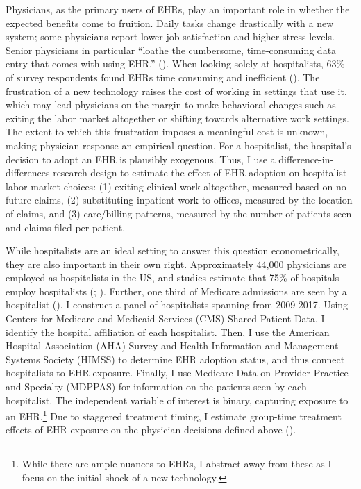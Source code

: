 \documentclass[12pt]{article}
\begin{document}
Physicians, as the primary users of EHRs, play an important role in whether the expected benefits come to fruition. Daily tasks change drastically with a new system; some physicians report lower job satisfaction and higher stress levels. Senior physicians in particular “loathe the cumbersome, time-consuming data entry that comes with using EHR.” (\cite{CollierBurnout}). When looking solely at hospitalists, 63\% of survey respondents found EHRs time consuming and inefficient (\cite{czernik2022hospitalist}). The frustration of a new technology raises the cost of working in settings that use it, which may lead physicians on the margin to make behavioral changes such as exiting the labor market altogether or shifting towards alternative work settings. The extent to which this frustration imposes a meaningful cost is unknown, making physician response an empirical question. For a hospitalist, the hospital's decision to adopt an EHR is plausibly exogenous. Thus, I use a difference-in-differences research design to estimate the effect of EHR adoption on hospitalist labor market choices: (1) exiting clinical work altogether, measured based on no future claims, (2) substituting inpatient work to offices, measured by the location of claims, and (3) care/billing patterns, measured by the number of patients seen and claims filed per patient.

While hospitalists are an ideal setting to answer this question econometrically, they are also important in their own right. Approximately 44,000 physicians are employed as hospitalists in the US, and studies estimate that 75\% of hospitals employ hospitalists (\cite{bls}; \cite{healthecareers_2022}). Further, one third of Medicare admissions are seen by a hospitalist (\cite{messler2015history}). I construct a panel of hospitalists spanning from 2009-2017. Using Centers for Medicare and Medicaid Services (CMS) Shared Patient Data, I identify the hospital affiliation of each hospitalist. Then, I use the American Hospital Association (AHA) Survey and Health Information and Management Systems Society (HIMSS) to determine EHR adoption status, and thus connect hospitalists to EHR exposure. Finally, I use Medicare Data on Provider Practice and Specialty (MDPPAS) for information on the patients seen by each hospitalist. The independent variable of interest is binary, capturing exposure to an EHR.\footnote{While there are ample nuances to EHRs, I abstract away from these as I focus on the initial shock of a new technology.} Due to staggered treatment timing, I estimate group-time treatment effects of EHR exposure on the physician decisions defined above (\cite{callaway2021difference}).
\end{document}
